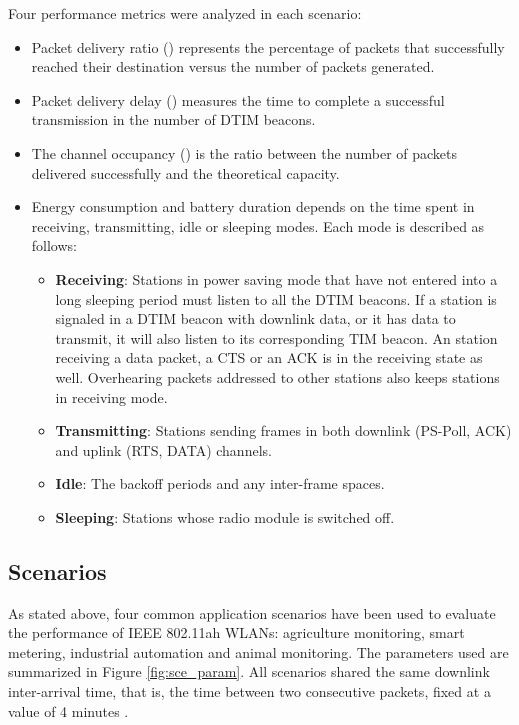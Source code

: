 \documentclass[]{article}
\begin{document}
\renewcommand{\figurename}{Figure}


Four performance metrics were analyzed in each scenario:

\begin{itemize}
 \item Packet delivery ratio () represents the percentage of packets that successfully reached their destination versus the number of packets generated.


\item Packet delivery delay () measures the time to complete a successful transmission in the number of DTIM beacons.
 
\item The channel occupancy () is the ratio between the number of packets delivered successfully and the theoretical capacity.


\item Energy consumption and battery duration depends on the time spent in receiving, transmitting, idle or sleeping modes. Each mode is described as follows:


\begin{itemize}
\item \textbf{Receiving}: Stations in power saving mode that have not entered into a long sleeping period must listen to all the DTIM beacons. If a station is signaled in a DTIM beacon with downlink data, or it has data to transmit, it will also listen to its corresponding TIM beacon. An station receiving a data packet, a CTS or an ACK is in the receiving state as well. Overhearing packets addressed to other stations also keeps stations in receiving mode.
	\item \textbf{Transmitting}: Stations sending frames in both downlink (PS-Poll, ACK) and uplink (RTS, DATA) channels.
	\item \textbf{Idle}: The backoff periods and any inter-frame spaces.
	\item \textbf{Sleeping}: Stations whose radio module is switched off. 
\end{itemize}

\end{itemize}


\subsection{Scenarios}

As stated above, four common application scenarios have been used to evaluate the performance of IEEE 802.11ah WLANs: agriculture monitoring, smart metering, industrial automation and animal monitoring. The parameters used are summarized in Figure \ref{fig:sce_param}. All scenarios shared the same downlink inter-arrival time, that is, the time between two consecutive packets, fixed at a value of 4 minutes \cite{scoop} .
\end{document}
